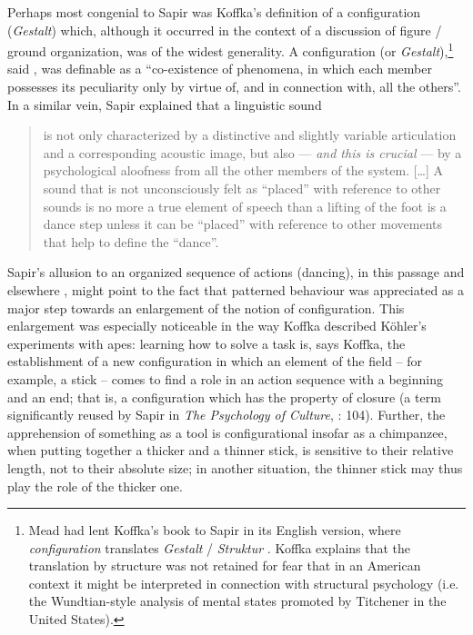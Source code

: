 \documentclass[output=paper]{langscibook}
\begin{document}
Perhaps most congenial to Sapir was Koffka's definition of a configuration (\emph{Gestalt}) which, although it occurred in the context of a discussion of figure / ground organization, was of the widest generality. A configuration (or \emph{Gestalt}),\footnote{Mead had lent Koffka's book to Sapir in its English version, where \emph{configuration} translates \emph{Gestalt} / \emph{Struktur} \citep[185]{Darnell1990}. Koffka explains that the translation by structure was not retained for fear that in an American context it might be interpreted in connection with structural psychology (i.e. the Wundtian-style analysis of mental states promoted by Titchener in the United States).} said \citet[146]{Koffka1924}, was definable as a ``co-existence of phenomena, in which each member possesses its peculiarity only by virtue of, and in connection with, all the others''. In a similar vein, Sapir explained that a linguistic sound 

\begin{quotation}
is not only characterized by a distinctive and slightly variable articulation and a corresponding acoustic image, but also — \emph{and this is crucial} — by a psychological aloofness from all the other members of the system. […] A sound that is not unconsciously felt as ``placed'' with reference to other sounds is no more a true element of speech than a lifting of the foot is a dance step unless it can be ``placed'' with reference to other movements that help to define the ``dance''. \citep[35]{Sapir1925}
\end{quotation}

Sapir's allusion to an organized sequence of actions (dancing), in this passage and elsewhere \citep[104--105]{Sapir2002}, might point to the fact that patterned behaviour was appreciated as a major step towards an enlargement of the notion of configuration. This enlargement was especially noticeable in the way Koffka described Köhler's experiments with apes: learning how to solve a task is, says Koffka, the establishment of a new configuration in which an element of the field -- for example, a stick -- comes to find a role in an action sequence with a beginning and an end; that is, a configuration which has the property of closure (a term significantly reused by Sapir in \emph{The Psychology of Culture}, \citeyear{Sapir2002}: 104). Further, the apprehension of something as a tool is configurational insofar as a chimpanzee, when putting together a thicker and a thinner stick, is sensitive to their relative length, not to their absolute size; in another situation, the thinner stick may thus play the role of the thicker one.
\end{document}
